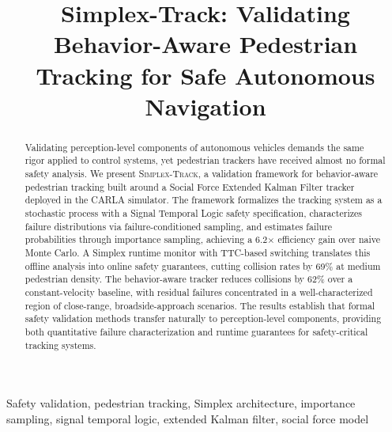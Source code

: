 \documentclass[conference]{IEEEtran}
\begin{document}
\title{Simplex-Track: Validating Behavior-Aware Pedestrian Tracking for Safe Autonomous Navigation}

\author{
\and
{}
}

\maketitle

\begin{abstract}
Validating perception-level components of autonomous vehicles demands the same rigor applied to control systems, yet pedestrian trackers have received almost no formal safety analysis. We present \textsc{Simplex-Track}, a validation framework for behavior-aware pedestrian tracking built around a Social Force Extended Kalman Filter tracker deployed in the CARLA simulator. The framework formalizes the tracking system as a stochastic process with a Signal Temporal Logic safety specification, characterizes failure distributions via failure-conditioned sampling, and estimates failure probabilities through importance sampling, achieving a 6.2$\times$ efficiency gain over naive Monte Carlo. A Simplex runtime monitor with TTC-based switching translates this offline analysis into online safety guarantees, cutting collision rates by 69\% at medium pedestrian density. The behavior-aware tracker reduces collisions by 62\% over a constant-velocity baseline, with residual failures concentrated in a well-characterized region of close-range, broadside-approach scenarios. The results establish that formal safety validation methods transfer naturally to perception-level components, providing both quantitative failure characterization and runtime guarantees for safety-critical tracking systems.
\end{abstract}

\begin{IEEEkeywords}
Safety validation, pedestrian tracking, Simplex architecture, importance sampling, signal temporal logic, extended Kalman filter, social force model
\end{IEEEkeywords}
\end{document}
